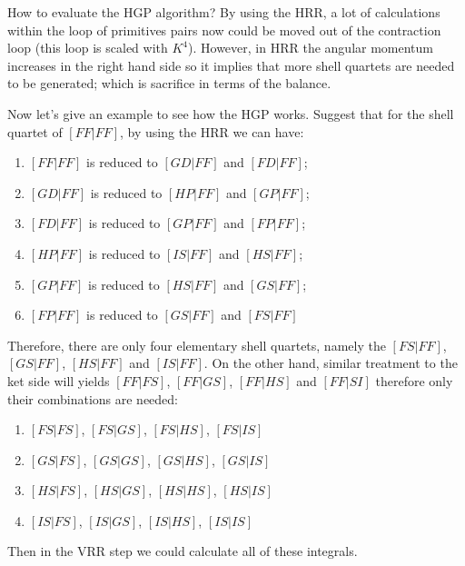 How to evaluate the HGP algorithm? By using the HRR, a lot of calculations
within the loop of primitives pairs now could be moved out of the contraction
loop (this loop is scaled with $K^{4}$). However, in HRR the angular momentum
increases in the right hand side so it implies that more shell quartets
are needed to be generated; which is sacrifice in terms of the balance. 

Now let's give an example to see how the HGP works. Suggest that for the 
shell quartet of $[FF|FF]$, by using the HRR we can have:
\begin{enumerate}
 \item $[FF|FF]$ is reduced to $[GD|FF]$ and $[FD|FF]$;
 \item $[GD|FF]$ is reduced to $[HP|FF]$ and $[GP|FF]$;
 \item $[FD|FF]$ is reduced to $[GP|FF]$ and $[FP|FF]$;
 \item $[HP|FF]$ is reduced to $[IS|FF]$ and $[HS|FF]$;
 \item $[GP|FF]$ is reduced to $[HS|FF]$ and $[GS|FF]$;
 \item $[FP|FF]$ is reduced to $[GS|FF]$ and $[FS|FF]$
\end{enumerate}
Therefore, there are only four elementary shell quartets, namely the 
$[FS|FF]$, $[GS|FF]$, $[HS|FF]$ and $[IS|FF]$. On the other hand, similar
treatment to the ket side will yields $[FF|FS]$, $[FF|GS]$, $[FF|HS]$ and
$[FF|SI]$ therefore only their combinations are needed:
\begin{enumerate}
 \item $[FS|FS]$, $[FS|GS]$, $[FS|HS]$, $[FS|IS]$
 \item $[GS|FS]$, $[GS|GS]$, $[GS|HS]$, $[GS|IS]$
 \item $[HS|FS]$, $[HS|GS]$, $[HS|HS]$, $[HS|IS]$
 \item $[IS|FS]$, $[IS|GS]$, $[IS|HS]$, $[IS|IS]$
\end{enumerate}
Then in the VRR step we could calculate all of these integrals.


